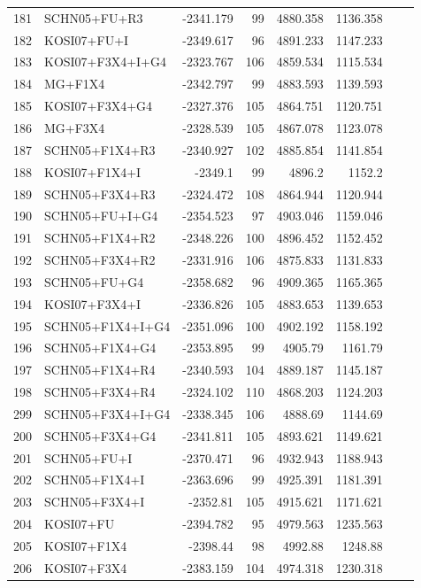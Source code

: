 \documentclass[fleqn,letterpaper]{article}
\begin{document}
\begin{longtable}{clrrrrrr}
	181 & SCHN05+FU+R3 & -2341.179 & 99 & 4880.358 & 1136.358 \\ 
	182 & KOSI07+FU+I & -2349.617 & 96 & 4891.233 & 1147.233 \\ 
	183 & KOSI07+F3X4+I+G4 & -2323.767 & 106 & 4859.534 & 1115.534 \\ 
	184 & MG+F1X4 & -2342.797 & 99 & 4883.593 & 1139.593 & \\ 
	185 & KOSI07+F3X4+G4 & -2327.376 & 105 & 4864.751 & 1120.751 \\ 
	186 & MG+F3X4 & -2328.539 & 105 & 4867.078 & 1123.078 \\ 
	187 & SCHN05+F1X4+R3 & -2340.927 & 102 & 4885.854 & 1141.854 \\ 
	188 & KOSI07+F1X4+I & -2349.1 & 99 & 4896.2 & 1152.2 & \\ 
	189 & SCHN05+F3X4+R3 & -2324.472 & 108 & 4864.944 & 1120.944 \\ 
	190 & SCHN05+FU+I+G4 & -2354.523 & 97 & 4903.046 & 1159.046 \\ 
	191 & SCHN05+F1X4+R2 & -2348.226 & 100 & 4896.452 & 1152.452 \\ 
	192 & SCHN05+F3X4+R2 & -2331.916 & 106 & 4875.833 & 1131.833 \\ 
	193 & SCHN05+FU+G4 & -2358.682 & 96 & 4909.365 & 1165.365 \\ 
	194 & KOSI07+F3X4+I & -2336.826 & 105 & 4883.653 & 1139.653 \\ 
	195 & SCHN05+F1X4+I+G4 & -2351.096 & 100 & 4902.192 & 1158.192 \\ 
	196 & SCHN05+F1X4+G4 & -2353.895 & 99 & 4905.79 & 1161.79 \\ 
	197 & SCHN05+F1X4+R4 & -2340.593 & 104 & 4889.187 & 1145.187 \\ 
	198 & SCHN05+F3X4+R4 & -2324.102 & 110 & 4868.203 & 1124.203 \\ 
	299 & SCHN05+F3X4+I+G4 & -2338.345 & 106 & 4888.69 & 1144.69 \\ 
	200 & SCHN05+F3X4+G4 & -2341.811 & 105 & 4893.621 & 1149.621 \\ 
	201 & SCHN05+FU+I & -2370.471 & 96 & 4932.943 & 1188.943 \\ 
	202 & SCHN05+F1X4+I & -2363.696 & 99 & 4925.391 & 1181.391 \\ 
	203 & SCHN05+F3X4+I & -2352.81 & 105 & 4915.621 & 1171.621 \\ 
	204 & KOSI07+FU & -2394.782 & 95 & 4979.563 & 1235.563 \\ 
	205 & KOSI07+F1X4 & -2398.44 & 98 & 4992.88 & 1248.88 \\ 
	206 & KOSI07+F3X4 & -2383.159 & 104 & 4974.318 & 1230.318 \\ 

\end{longtable}
\end{document}
